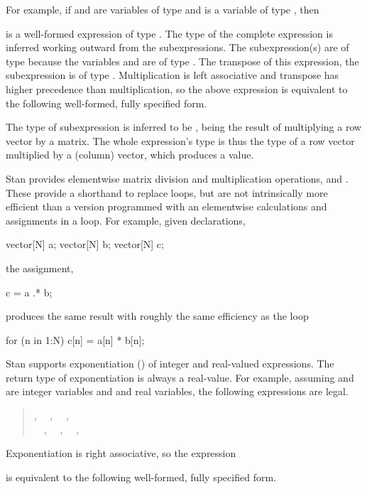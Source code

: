 For example, if  and  are variables of type
 and  is a variable of type ,
then
%
\begin{quote}
\end{quote}
%
is a well-formed expression of type .  The type of the
complete expression is inferred working outward from the
subexpressions.  The subexpression(s)  are of type
 because the variables  and  are of type
.  The transpose of this expression, the subexpression
 is of type .  Multiplication is
left associative and transpose has higher precedence than
multiplication, so the above expression is equivalent to the following
well-formed, fully specified form.
%
\begin{quote}
\end{quote}
%
The type of subexpression  is inferred to be
, being the result of multiplying a row vector by a
matrix.  The whole expression's type is thus the type of a row vector
multiplied by a (column) vector, which produces a  value.

Stan provides elementwise matrix division and multiplication
operations,  and .  These provide a shorthand
to replace loops, but are not intrinsically more efficient than a
version programmed with an elementwise calculations and assignments in
a loop.  For example, given declarations,
%
\begin{stancode}
vector[N] a;
vector[N] b;
vector[N] c;
\end{stancode}
%
the assignment,
%
\begin{stancode}
c = a .* b;
\end{stancode}
%
produces the same result with roughly the same efficiency as the loop
%
\begin{stancode}
for (n in 1:N)
  c[n] = a[n] * b[n];
\end{stancode}

Stan supports exponentiation (\code{\textasciicircum}) of integer and
real-valued expressions.  The return type of exponentiation is always
a real-value.  For example, assuming  and  are integer
variables and  and  real variables, the following
expressions are legal.
%
\begin{quote}
,
\ \ ,
\ \ ,
\\
\ \ ,
\ \ ,
\ \ ,
\ \ 
\end{quote}
%
Exponentiation is right associative, so the expression
%
\begin{quote}
\end{quote}
%
is equivalent to the following well-formed, fully specified form.
%
\begin{quote}
\end{quote}
%



